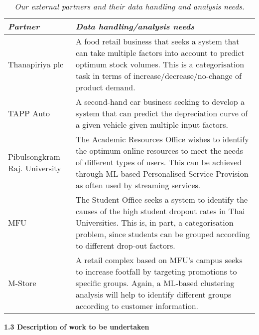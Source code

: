 \documentclass[11pt]{article}
\begin{document}
  \begin{table}[h]
  \begin{tabular}{p{3cm}|p{13.1cm}}
    {\it Partner} & {\it Data handling/analysis needs}\\
    \hline
    \hline
    Thanapiriya plc & A food retail business that seeks a system that can take multiple factors into account to predict optimum stock volumes. This is a categorisation task in terms of increase/decrease/no-change of product demand.\\
    \hline
    TAPP Auto & A second-hand car business seeking to develop a system that can predict the depreciation curve of a given vehicle given multiple input factors.\\
    \hline
    Pibulsongkram Raj. University & The Academic Resources Office wishes to identify the optimum online resources to meet the needs of different types of users. This can be achieved through ML-based Personalised Service Provision as often used by streaming services.\\
    \hline
    MFU & The Student Office seeks a system to identify the causes of the high student dropout rates in Thai Universities. This is, in part, a categorisation problem, since students can be grouped according to different drop-out factors. \\
    \hline
    M-Store & A retail complex based on MFU's campus seeks to increase footfall by targeting promotions to specific groups. Again, a ML-based clustering analysis will help to identify different groups according to customer information. \\
    \hline
  \end{tabular}
  \caption{\it Our external partners and their data handling and analysis needs. }
  \vspace{-5mm}
  \end{table}
  
  \vspace{3mm}
  \noindent
  {\large \bf 1.3 Description of work to be undertaken}
  
\end{document}
